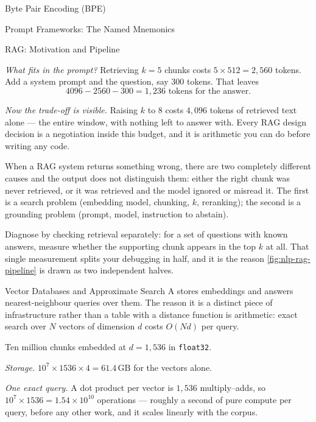 \begin{v3topic}{Byte Pair Encoding (BPE)}
\begin{v3topic}{Prompt Frameworks: The Named Mnemonics}
\begin{v3topic}{RAG: Motivation and Pipeline}
\begin{workedexample}
\emph{What fits in the prompt?} Retrieving $k=5$ chunks costs
$5 \times 512 = 2{,}560$ tokens. Add a system prompt and the question, say
$300$ tokens. That leaves
\[
  4096 - 2560 - 300 = 1{,}236 \text{ tokens for the answer.}
\]

\emph{Now the trade-off is visible.} Raising $k$ to $8$ costs $4{,}096$ tokens
of retrieved text alone --- the entire window, with nothing left to answer
with. Every RAG design decision is a negotiation inside this budget, and it is
arithmetic you can do before writing any code.
\end{workedexample}

\begin{cautionbox}
When a RAG system returns something wrong, there are two completely different
causes and the output does not distinguish them: either the right chunk was
never retrieved, or it was retrieved and the model ignored or misread it. The
first is a search problem (embedding model, chunking, $k$, reranking); the
second is a grounding problem (prompt, model, instruction to abstain).

Diagnose by checking retrieval separately: for a set of questions with known
answers, measure whether the supporting chunk appears in the top $k$ at all.
That single measurement splits your debugging in half, and it is the reason
\cref{fig:nlp-rag-pipeline} is drawn as two independent halves.
\end{cautionbox}

\end{v3topic}
\begin{v3topic}{Vector Databases and Approximate Search}
    A  stores embeddings and answers nearest-neighbour
    queries over them. The reason it is a distinct piece of infrastructure
    rather than a table with a distance function is arithmetic: exact search
    over $N$ vectors of dimension $d$ costs $O(Nd)$ per query.

\begin{workedexample}
Ten million chunks embedded at $d = 1{,}536$ in \texttt{float32}.

\emph{Storage.} $10^7 \times 1536 \times 4 = 61.4\,\text{GB}$ for the vectors
alone.

\emph{One exact query.} A dot product per vector is $1{,}536$ multiply--adds,
so $10^7 \times 1536 = 1.54\times10^{10}$ operations --- roughly a second of
pure compute per query, before any other work, and it scales linearly with the
corpus.


\end{workedexample}
\end{v3topic}
\end{v3topic}
\end{v3topic}
